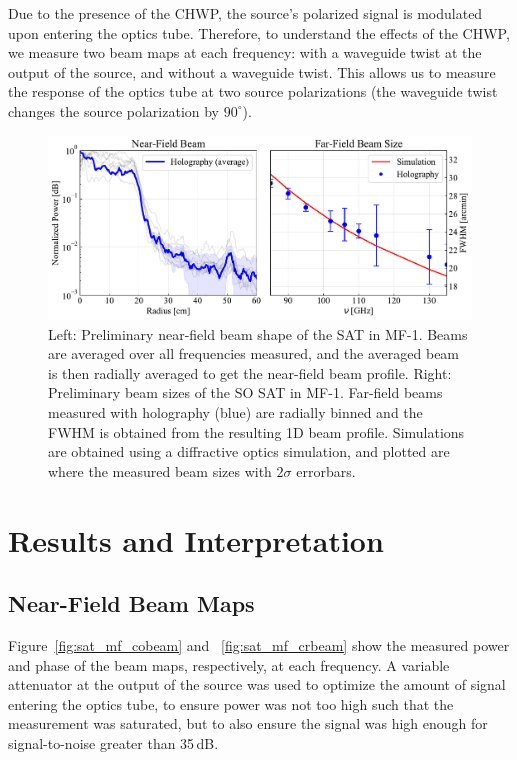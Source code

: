Due to the presence of the CHWP, the source's polarized signal is modulated upon entering the optics tube.  Therefore, to understand the effects of the CHWP, we measure two beam maps at each frequency: with a waveguide twist at the output of the source, and without a waveguide twist.  This allows us to measure the response of the optics tube at two source polarizations (the waveguide twist changes the source polarization by $90^{\circ}$).

 \begin{figure}[t!]
    \centering
    \includegraphics[width =\textwidth]{Figures/SAT_MF1_beam.pdf}
    \caption{Left: Preliminary near-field beam shape of the SAT in MF-1.  Beams are averaged over all frequencies measured, and the averaged beam is then radially averaged to get the near-field beam profile.  Right: Preliminary beam sizes of the SO SAT in MF-1.  Far-field beams measured with holography (blue) are radially binned and the FWHM is obtained from the resulting 1D beam profile.  Simulations are obtained using a diffractive optics simulation, and plotted are where the measured beam sizes with $2\sigma$ errorbars.}
    \label{fig:sat_fwhm}
\end{figure}

\section{Results and Interpretation}
\label{sec:sat_results}

\subsection{Near-Field Beam Maps}
Figure~\ref{fig:sat_mf_cobeam} and ~\ref{fig:sat_mf_crbeam} show the measured power and phase of the beam maps, respectively, at each frequency.   A variable attenuator at the output of the source was used to optimize the amount of signal entering the optics tube, to ensure power was not too high such that the measurement was saturated, but to also ensure the signal was high enough for signal-to-noise greater than 35\,dB.

